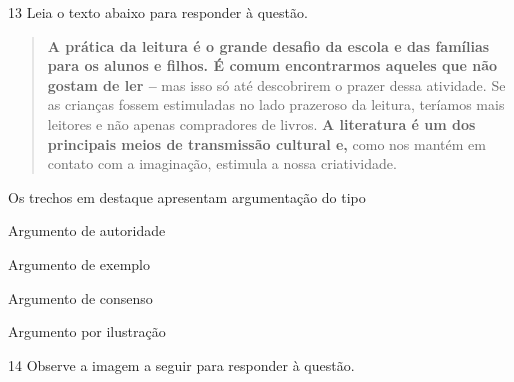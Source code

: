 \pagebreak

\num{13} Leia o texto abaixo para responder à questão. 

\begin{quote}

\textbf{A prática da leitura é o grande desafio da escola e das famílias
para os alunos e filhos. É comum encontrarmos aqueles que não gostam de
ler --} mas isso só até descobrirem o prazer dessa atividade. Se as
crianças fossem estimuladas no lado prazeroso da leitura, teríamos mais
leitores e não apenas compradores de livros. \textbf{A literatura é um
dos principais meios de transmissão cultural e,} como nos mantém em
contato com a imaginação, estimula a nossa criatividade.

\end{quote}


Os trechos em destaque apresentam argumentação do tipo

\begin{escolha}

    \item Argumento de autoridade

    \item Argumento de exemplo

    \item Argumento de consenso

    \item Argumento por ilustração

\end{escolha}

\pagebreak

\num{14} Observe a imagem a seguir para responder à questão.

